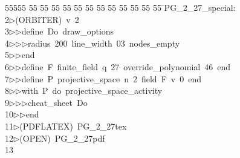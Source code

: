 %
%
\begin{tabbing}
55555 \= 55 \= 55 \= 55 \= 55 \= 55 \= 55 \= 55 \= 55 \= 55 \= 55 \= 55 \= 55 \= \>PG\_2\_27\_special:\\[0pt]
2\>$\triangleright$\>(ORBITER)\ v\ 2\ \\[0pt]
3\>$\triangleright$\>$\triangleright$\>define\ Do\ draw\_options\ \\[0pt]
4\>$\triangleright$\>$\triangleright$\>$\triangleright$\>radius\ 200\ line\_width\ 03\ nodes\_empty\ \\[0pt]
5\>$\triangleright$\>$\triangleright$\>end\ \\[0pt]
6\>$\triangleright$\>$\triangleright$\>define\ F\ finite\_field\ q\ 27\ override\_polynomial\ 46\ end\ \\[0pt]
7\>$\triangleright$\>$\triangleright$\>define\ P\ projective\_space\ n\ 2\ field\ F\ v\ 0\ end\ \\[0pt]
8\>$\triangleright$\>$\triangleright$\>with\ P\ do\ projective\_space\_activity\ \\[0pt]
9\>$\triangleright$\>$\triangleright$\>$\triangleright$\>cheat\_sheet\ Do\ \\[0pt]
10\>$\triangleright$\>$\triangleright$\>end\\[0pt]
11\>$\triangleright$\>(PDFLATEX)\ PG\_2\_27tex\ \\[0pt]
12\>$\triangleright$\>(OPEN)\ PG\_2\_27pdf\\[0pt]
13\>\end{tabbing}
